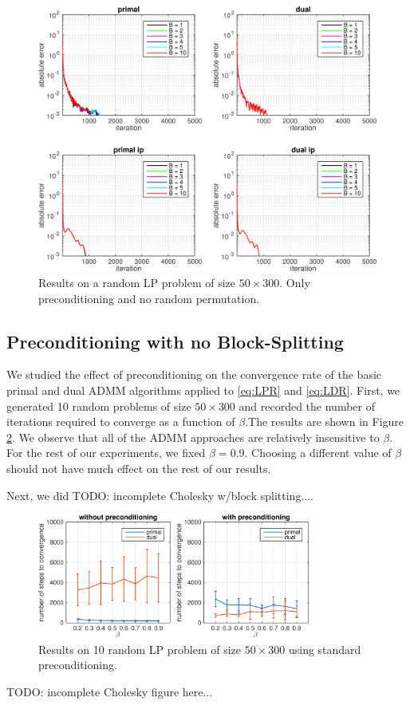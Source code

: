 \documentclass{article}
\begin{document}
\begin{figure}[h]
	\includegraphics[width=\textwidth]{../figures/precond_norndperm.png}
	\caption{Results on a random LP problem of size $50 \times 300$. Only preconditioning and no random permutation.}
	\label{fig:p_nor}
\end{figure}

\subsection*{Preconditioning with no Block-Splitting}

We studied the effect of preconditioning on the convergence rate of the basic primal and dual ADMM algorithms applied to \eqref{eq:LPR} and \eqref{eq:LDR}. First, we generated 10 random problems of size $50 \times 300$ and recorded the number of iterations required to converge as a function of $\beta$.The results  are shown in Figure \ref{fig:base_p_d}. We observe that all of the ADMM approaches are relatively insensitive to $\beta$. For the rest of our experiments, we fixed $\beta=0.9$. Choosing a different value of $\beta$ should not have much effect on the rest of our results. 

Next, we did TODO: incomplete Cholesky w/block splitting....

\begin{figure}[ht]
	\centering
	\includegraphics[width=0.8\textwidth]{../figures/primal_dual_preconditioning.png}
	\caption{Results on 10 random LP problem of size $50 \times 300$ using standard preconditioning. }
	\label{fig:base_p_d}
\end{figure}
TODO: incomplete Cholesky figure here...
\end{document}

